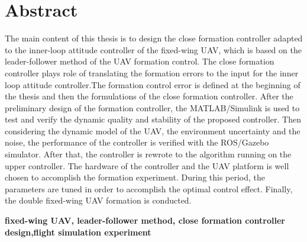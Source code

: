 \vspace*{17mm}

{\let\clearpage\relax \chapter*{
  \textmd{Abstract}\vskip -3bp}}
\setcounter{page}{2}

\setlength{\parskip}{0em}

The main content of this thesis is to design the close formation controller adapted to the inner-loop attitude controller of the fixed-wing UAV, which is based on the leader-follower method of the UAV formation control. The close formation controller plays role of translating the formation errors to the input for the inner loop attitude controller.The formation control error is defined at the beginning of the thesis and then the formulations of the close formation controller. After the preliminary design of the formation controller, the MATLAB/Simulink is used to test and verify the dynamic quality and stability of the proposed controller. Then considering the dynamic model of the  UAV, the environment uncertainty and the noise, the performance of the controller is verified with the ROS/Gazebo simulator. After that, the controller is rewrote to the algorithm running on the upper controller. The hardware of the controller and the UAV platform is well chosen to accomplish the formation experiment. During this period, the parameters are tuned in order to accomplish the optimal control effect.
Finally, the double fixed-wing UAV formation is conducted.

\vspace{3ex}\noindent\textbf{fixed-wing UAV, leader-follower method, close formation controller design,flight simulation experiment}
\newpage
